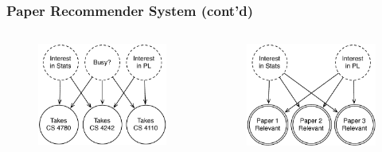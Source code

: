 \documentclass[usenames,dvipsnames]{beamer}
\begin{document}
\begin{frame}
  \frametitle{Paper Recommender System (cont'd)}
  \begin{columns}[t]
    \begin{column}{.48\textwidth}
      \begin{figure}[ht]
        \centering
        \includegraphics[width=0.7\textheight,keepaspectratio]{figures/ex-model-full.pdf}
        \caption*{\label{fig:ex-causal-full}}
      \end{figure}
    \end{column}
    \begin{column}{.48\textwidth}
      \begin{figure}[ht]
        \centering
        \includegraphics[width=0.7\textheight,keepaspectratio]{figures/ex-model-out.pdf}
        \caption*{\label{fig:ex-causal-out}}
      \end{figure}
    \end{column}
  \end{columns}
\end{frame}
\end{document}
